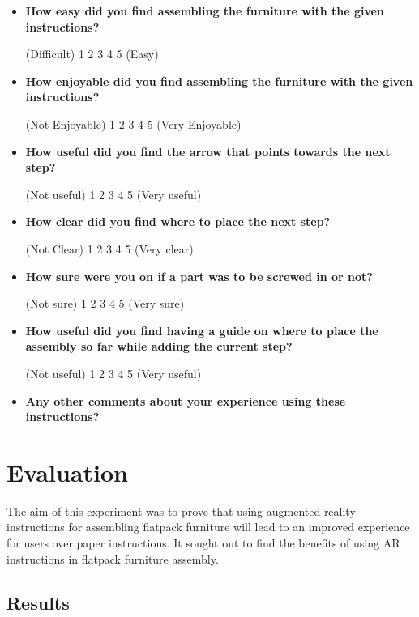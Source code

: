 \documentclass{l4proj}
\begin{document}
\begin{itemize}
    \item \textbf{How easy did you find assembling the furniture with the given instructions?}
    
    \centerline{(Difficult) 1 2 3 4 5 (Easy)}
    
    \item \textbf{How enjoyable did you find assembling the furniture with the given instructions?}

    \centerline{(Not Enjoyable) 1 2 3 4 5 (Very Enjoyable)}

    \item \textbf{How useful did you find the arrow that points towards the next step?}

    \centerline{(Not useful) 1 2 3 4 5 (Very useful)}

    \item \textbf{How clear did you find where to place the next step?}

    \centerline{(Not Clear) 1 2 3 4 5 (Very clear)}

    \item \textbf{How sure were you on if a part was to be screwed in or not?}

    \centerline{(Not sure) 1 2 3 4 5 (Very sure)}

    \item \textbf{How useful did you find having a guide on where to place the assembly so far while adding the current step?}

    \centerline{(Not useful) 1 2 3 4 5 (Very useful)}

    \item \textbf{Any other comments about your experience using these instructions?}
\end{itemize}

\chapter{Evaluation} 
\label{chap:evaluation}

The aim of this experiment was to prove that using augmented reality instructions for assembling flatpack furniture will lead to an improved experience for users over paper instructions. It sought out to find the benefits of using AR instructions in flatpack furniture assembly.

\section{Results}
\end{document}
